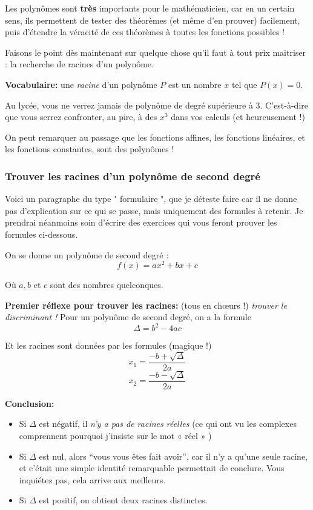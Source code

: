 \documentclass[french,]{article}
\providecommand{\tightlist}{%
  \setlength{\itemsep}{0pt}\setlength{\parskip}{0pt}}
\begin{document}
Les polynômes sont \textbf{très} importants pour le mathématicien, car
en un certain sens, ils permettent de tester des théorèmes (et même d'en
prouver) facilement, puis d'étendre la véracité de ces théorèmes à
toutes les fonctions possibles !

Faisons le point dès maintenant sur quelque chose qu'il faut à tout prix
maitriser : la recherche de racines d'un polynôme.

\textbf{Vocabulaire:} une \emph{racine} d'un polynôme \(P\) est un
nombre \(x\) tel que \(P(x) = 0\).

Au lycée, vous ne verrez jamais de polynôme de degré supérieure à 3.
C'est-à-dire que vous serrez confronter, au pire, à des \(x^3\) dans vos
calculs (et heureusement !)

On peut remarquer au passage que les fonctions affines, les fonctions
linéaires, et les fonctions constantes, sont des polynômes !

\hypertarget{trouver-les-racines-dun-polynuxf4me-de-second-degruxe9}{%
\subsubsection{Trouver les racines d'un polynôme de second
degré}\label{trouver-les-racines-dun-polynuxf4me-de-second-degruxe9}}

Voici un paragraphe du type " formulaire ", que je déteste faire car il
ne donne pas d'explication sur ce qui se passe, mais uniquement des
formules à retenir. Je prendrai néanmoins soin d'écrire des exercices
qui vous feront prouver les formules ci-dessous.

On se donne un polynôme de second degré : \[ f(x) = ax^2 + bx + c\]

Où \(a,b\) et \(c\) sont des nombres quelconques.

\textbf{Premier réflexe pour trouver les racines:} (tous en chœurs !)
\emph{trouver le discriminant !} Pour un polynôme de second degré, on a
la formule \[ \boxed{ \Delta = b^2 - 4ac }\]

Et les racines sont données par les formules (magique !)
\[ x_1 = \frac{ - b + \sqrt{\Delta}}{2a}\]
\[ x_2 = \frac{ - b - \sqrt{\Delta}}{2a}\]

\textbf{Conclusion:}

\begin{itemize}
\tightlist
\item
  Si \(\Delta\) est négatif, il \emph{n'y a pas de racines réelles} (ce
  qui ont vu les complexes comprennent pourquoi j'insiste sur le mot «
  réel » )
\item
  Si \(\Delta\) est nul, alors ``vous vous êtes fait avoir'', car il n'y
  a qu'une seule racine, et c'était une simple identité remarquable
  permettait de conclure. Vous inquiétez pas, cela arrive aux meilleurs.
\item
  Si \(\Delta\) est positif, on obtient deux racines distinctes.
\end{itemize}
\end{document}
